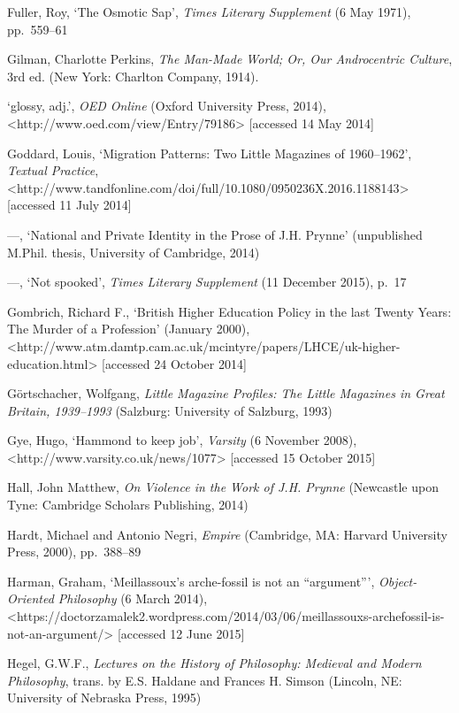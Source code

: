 \documentclass[]{article}
\begin{document}
Fuller, Roy, ‘The Osmotic Sap’, \emph{Times Literary Supplement} (6 May
1971), pp.~559–61

Gilman, Charlotte Perkins, \emph{The Man-Made World; Or, Our
Androcentric Culture}, 3rd ed. (New York: Charlton Company, 1914).

‘glossy, adj.’, \emph{OED Online} (Oxford University Press, 2014),\\
\textless{}http://www.oed.com/view/Entry/79186\textgreater{} {[}accessed
14 May 2014{]}

Goddard, Louis, ‘Migration Patterns: Two Little Magazines of 1960–1962’,
\emph{Textual Practice},\\
\textless{}http://www.tandfonline.com/doi/full/10.1080/0950236X.2016.1188143\textgreater{}
{[}accessed 11 July 2014{]}

—, ‘National and Private Identity in the Prose of J.H. Prynne’
(unpublished M.Phil. thesis, University of Cambridge, 2014)

—, ‘Not spooked’, \emph{Times Literary Supplement} (11 December 2015),
p.~17

Gombrich, Richard F., ‘British Higher Education Policy in the last
Twenty Years: The Murder of a Profession’ (January 2000),\\
\textless{}http://www.atm.damtp.cam.ac.uk/mcintyre/papers/LHCE/uk-higher-education.html\textgreater{}
{[}accessed 24 October 2014{]}

Görtschacher, Wolfgang, \emph{Little Magazine Profiles: The Little
Magazines in Great Britain, 1939–1993} (Salzburg: University of
Salzburg, 1993)

Gye, Hugo, ‘Hammond to keep job’, \emph{Varsity} (6 November 2008),\\
\textless{}http://www.varsity.co.uk/news/1077\textgreater{} {[}accessed
15 October 2015{]}

Hall, John Matthew, \emph{On Violence in the Work of J.H. Prynne}
(Newcastle upon Tyne: Cambridge Scholars Publishing, 2014)

Hardt, Michael and Antonio Negri, \emph{Empire} (Cambridge, MA: Harvard
University Press, 2000), pp.~388–89

Harman, Graham, ‘Meillassoux’s arche-fossil is not an “argument”’,
\emph{Object-Oriented Philosophy} (6 March 2014),\\
\textless{}https://doctorzamalek2.wordpress.com/2014/03/06/meillassouxs-archefossil-is-not-an-argument/\textgreater{}
{[}accessed 12 June 2015{]}

Hegel, G.W.F., \emph{Lectures on the History of Philosophy: Medieval and
Modern Philosophy}, trans. by E.S. Haldane and Frances H. Simson
(Lincoln, NE: University of Nebraska Press, 1995)
\end{document}

